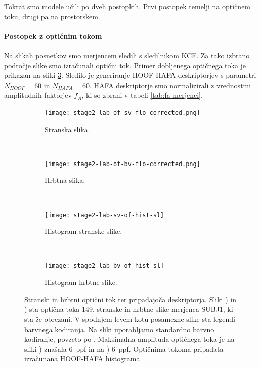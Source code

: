 Tokrat smo modele učili po dveh postopkih. Prvi postopek temelji na optičnem toku, drugi pa na prostorskem.

\paragraph{Postopek z optičnim tokom}
Na slikah posnetkov smo merjencem sledili s sledilnikom KCF. Za tako izbrano področje slike smo izračunali optični tok. Primer dobljenega optičnega toka je prikazan na sliki \ref{fig:opticni-tok-stage2}. Sledilo je generiranje HOOF-HAFA deskriptorjev s parametri $N_{HOOF} = 60$ in $N_{HAFA} = 60$. HAFA deskriptorje smo normalizirali z vrednostmi amplitudnih faktorjev $f_A$, ki so zbrani v tabeli \ref{tab:fa-merjenci}.


\begin{figure}[!htb]
	\centering
	\begin{subfigure}[t]{0.45\columnwidth}
		\centering
		\texttt{[image: stage2-lab-of-sv-flo-corrected.png]}
		\caption{Stranska slika.}
		\label{fig:stage2-lab-of-sv-flo}
	\end{subfigure}
	~
	\begin{subfigure}[t]{0.45\columnwidth}
		\centering
		\texttt{[image: stage2-lab-of-bv-flo-corrected.png]}
		\caption{Hrbtna slika.}
		\label{fig:stage2-lab-of-bv-flo}
	\end{subfigure}
	~
	\begin{subfigure}[t]{0.45\columnwidth}
		\texttt{[image: stage2-lab-sv-of-hist-sl]}
		\caption{Histogram stranske slike.}
	\end{subfigure}
	~
	\begin{subfigure}[t]{0.45\columnwidth}
		\texttt{[image: stage2-lab-bv-of-hist-sl]}
		\caption{Histogram hrbtne slike.}
	\end{subfigure}
    \caption[Stranski in hrbtni optični tok ter pripadajoča deskriptorja]{Stranski in hrbtni optični tok ter pripadajoča deskriptorja. Sliki ) in ) sta optična toka 149. stranske in hrbtne slike merjenca SUBJ1, ki sta že obrezani. V spodnjem levem kotu posamezne slike sta legendi barvnega kodiranja. Na sliki uporabljamo standardno barvno kodiranje, povzeto po \cite{baker2011database}. Maksimalna amplituda optičnega toka je na sliki  ) znašala \SI{6}{ppf} in na ) \SI{6}{ppf}. Optičnima tokoma pripadata izračunana HOOF-HAFA histograma.}
	\label{fig:opticni-tok-stage2}
\end{figure}

